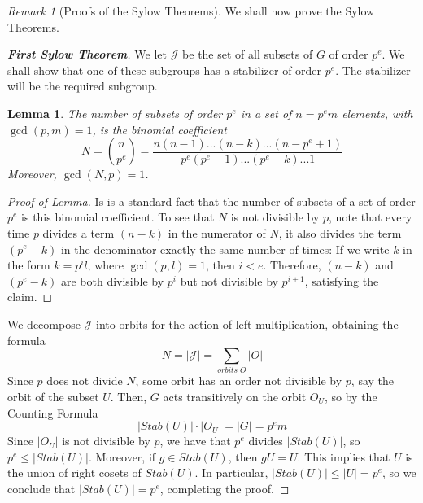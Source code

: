 \documentclass[12pt]{article}
\newtheorem{lem}[thm]{Lemma}  %
\theoremstyle{definition}
\theoremstyle{remark}
\newtheorem{rmk}[thm]{Remark}
\numberwithin{equation}{section}
\newcommand\B[1]{\textbf{ #1}}
\begin{document}
\begin{rmk}[Proofs of the Sylow Theorems]
        We shall now prove the Sylow Theorems.
\end{rmk}
\begin{proof}
        [\B{First Sylow Theorem}] We let $\mathcal{J}$ be the set of all subsets of $G$ of order $p^e$. We shall show that one of these subgroups has a stabilizer of order $p^e$. The stabilizer will be the required subgroup. 

        \begin{lem}
                The number of subsets of order $p^e$ in a set of $n = p^em$ elements, with $\gcd(p,m) = 1$, is the binomial coefficient \begin{equation}
                        N = \binom{n}{p^e} = \frac{n(n-1)...(n-k)...(n-p^e+1)}{p^e(p^e-1)...(p^e-k)...1}
                \end{equation}
                Moreover, $\gcd(N,p) =1$.
        \end{lem}
        \begin{proof}
                [Proof of Lemma] Is is a standard fact that the number of subsets of a set of order $p^e$ is this binomial coefficient. To see that $N$ is not divisible by $p$, note that every time $p$ divides a term $(n-k)$ in the numerator of $N$, it also divides the term $(p^e-k)$ in the denominator exactly the same number of times: If we write $k$ in the form $k =p^il$, where $\gcd(p,l) = 1$, then $i < e$. Therefore, $(n-k)$ and $(p^e - k)$ are both divisible by $p^i$ but not divisible by $p^{i+1}$, satisfying the claim.
        \end{proof}


        We decompose $\mathcal{J}$ into orbits for the action of left multiplication, obtaining the formula \begin{equation}
                N = |\mathcal{J}| = \sum\limits_{orbits\;O}|O|
        \end{equation}
        Since $p$ does not divide $N$, some orbit has an order not divisible by $p$, say the orbit of the subset $U$. Then, $G$ acts transitively on the orbit $O_U$, so by the Counting Formula \begin{equation}
                |Stab(U)|\cdot|O_U| = |G| = p^em
        \end{equation}
        Since $|O_U|$ is not divisible by $p$, we have that $p^e$ divides $|Stab(U)|$, so $p^e \leq |Stab(U)|$. Moreover, if $g \in Stab(U)$, then $gU = U$. This implies that $U$ is the union of right cosets of $Stab(U)$. In particular, $|Stab(U)| \leq |U| = p^e$, so we conclude that $|Stab(U)| = p^e$, completing the proof. 
\end{proof}
\vspace{15pt}
\end{document}

